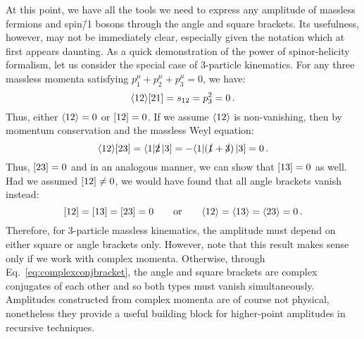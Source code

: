 \documentclass[main.tex]{subfiles}
\begin{document}
At this point, we have all the tools we need to express any amplitude of massless fermions and spin\=/1 bosons through the angle and square brackets. Its usefulness, however, may not be immediately clear, especially given the notation which at first appears daunting. As a quick demonstration of the power of spinor-helicity formalism, let us consider the special case of 3-particle kinematics. For any three massless momenta satisfying $p_1^\mu + p_2^\mu + p_3^\mu = 0$, we have:
\begin{equation}
    \langle 12 \rangle[ 21 ] = s_{12} = p_3^2 = 0\,.
\end{equation}
Thus, either $\langle 12 \rangle = 0$ or $[ 12 ] = 0$. If we assume $\langle 12 \rangle$ is non-vanishing, then by momentum conservation and the massless Weyl equation:
\begin{equation}
    \langle 12 \rangle[ 23 ] = \langle 1|\slashed{2}\left| 3 \right] = -\langle 1|(\slashed{1}+\slashed{3})\left| 3 \right] = 0\,.
\end{equation}
Thus, $[ 23 ] = 0$ and in an analogous manner, we can show that $[ 13 ] = 0$ as well. Had we assumed $[ 12 ] \neq 0$, we would have found that all angle brackets vanish instead:
\begin{equation}
    [ 12 ] = [ 13 ] = [ 23 ] = 0 \qquad \text{or} \qquad \langle 12 \rangle = \langle 13 \rangle = \langle 23 \rangle = 0 \,.
\end{equation}
Therefore, for 3-particle massless kinematics, the amplitude must depend on either square or angle brackets only. However, note that this result makes sense only if we work with complex momenta. Otherwise, through Eq.~\ref{eq:complexconjbracket}, the angle and square brackets are complex conjugates of each other and so both types must vanish simultaneously. Amplitudes constructed from complex momenta are of course not physical, nonetheless they provide a useful building block for higher-point amplitudes in recursive techniques.
\end{document}
